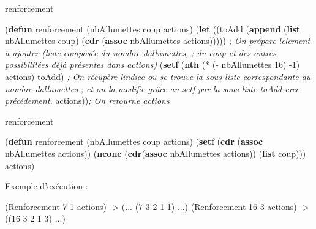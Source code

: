 \documentclass[
]{article}
\newenvironment{Shaded}{}{}
\newcommand{\CommentTok}[1]{\textcolor[rgb]{0.38,0.63,0.69}{\textit{#1}}}
\newcommand{\DecValTok}[1]{\textcolor[rgb]{0.25,0.63,0.44}{#1}}
\newcommand{\FunctionTok}[1]{\textcolor[rgb]{0.02,0.16,0.49}{#1}}
\newcommand{\KeywordTok}[1]{\textcolor[rgb]{0.00,0.44,0.13}{\textbf{#1}}}
\newcommand{\NormalTok}[1]{#1}
\newcommand{\OperatorTok}[1]{\textcolor[rgb]{0.40,0.40,0.40}{#1}}
\begin{document}
\begin{Shaded}
    \begin{algorithm}[H]
        \caption{renforcement}
\begin{Highlighting}[]
\NormalTok{(}\KeywordTok{defun}\FunctionTok{ renforcement }\NormalTok{(nbAllumettes coup actions)}
\NormalTok{    (}\KeywordTok{let}\NormalTok{ ((toAdd (}\KeywordTok{append}\NormalTok{ (}\KeywordTok{list}\NormalTok{ nbAllumettes coup) }\NormalTok{(}\KeywordTok{cdr}\NormalTok{ (}\KeywordTok{assoc}\NormalTok{ nbAllumettes actions)))))}
    \CommentTok{; On prépare l\textquotesingle{}element a ajouter (liste composée du nombre d\textquotesingle{}allumettes,}
    \CommentTok{; du coup et des autres possibilitées déjà présentes dans actions)}
\NormalTok{    (}\KeywordTok{setf}\NormalTok{ (}\KeywordTok{nth}\NormalTok{  (}\OperatorTok{*}\NormalTok{ (}\OperatorTok{{-}}\NormalTok{ nbAllumettes }\DecValTok{16}\NormalTok{) }\DecValTok{{-}1}\NormalTok{) actions) toAdd)}
    \CommentTok{; On récupère l\textquotesingle{}indice ou se trouve la sous-liste correspondante au nombre d\textquotesingle{}allumettes}
    \CommentTok{; et on la modifie grâce au setf par la sous-liste toAdd cree précédement.}
\NormalTok{    actions))}\CommentTok{; On retourne actions}
\end{Highlighting}
\end{algorithm}
\end{Shaded}

\begin{Shaded}
    \begin{algorithm}[H]
        \caption{renforcement}
\begin{Highlighting}[]
\NormalTok{(}\KeywordTok{defun}\FunctionTok{ renforcement }\NormalTok{(nbAllumettes coup actions)}
\NormalTok{  (}\KeywordTok{setf}\NormalTok{ (}\KeywordTok{cdr}\NormalTok{ (}\KeywordTok{assoc}\NormalTok{ nbAllumettes actions))}
\NormalTok{    (}\KeywordTok{nconc}\NormalTok{ (}\KeywordTok{cdr}\NormalTok{(}\KeywordTok{assoc}\NormalTok{ nbAllumettes actions)) (}\KeywordTok{list}\NormalTok{ coup)))}
\NormalTok{    actions)}
\end{Highlighting}
\end{algorithm}
\end{Shaded}

Exemple d'exécution :

\begin{Shaded}
    \begin{algorithm}[H]
\begin{Highlighting}[]
\NormalTok{(Renforcement }\DecValTok{7} \DecValTok{1}\NormalTok{ actions) {-}\textgreater{} (... (}\DecValTok{7} \DecValTok{3} \DecValTok{2} \DecValTok{1} \DecValTok{1}\NormalTok{) ...)}
\NormalTok{(Renforcement }\DecValTok{16} \DecValTok{3}\NormalTok{ actions) {-}\textgreater{} ((}\DecValTok{16} \DecValTok{3} \DecValTok{2} \DecValTok{1} \DecValTok{3}\NormalTok{) ...)}
\end{Highlighting}
\end{algorithm}
\end{Shaded}
\end{document}
